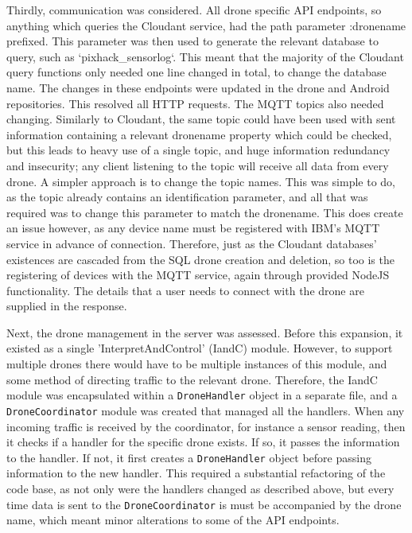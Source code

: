\documentclass{article}
\begin{document}
Thirdly, communication was considered. All drone specific API endpoints, so anything which queries the Cloudant service, had the path parameter :dronename prefixed. This parameter was then used to generate the relevant database to query, such as `pixhack\_sensorlog`. This meant that the majority of the Cloudant query functions only needed one line changed in total, to change the database name. The changes in these endpoints were updated in the drone and Android repositories. This resolved all HTTP requests. The MQTT topics also needed changing. Similarly to Cloudant, the same topic could have been used with sent information containing a relevant dronename property which could be checked, but this leads to heavy use of a single topic, and huge information redundancy and insecurity; any client listening to the topic will receive all data from every drone. A simpler approach is to change the topic names. This was simple to do, as the topic already contains an identification parameter, and all that was required was to change this parameter to match the dronename. This does create an issue however, as any device name must be registered with IBM's MQTT service in advance of connection. Therefore, just as the Cloudant databases' existences are cascaded from the SQL drone creation and deletion, so too is the registering of devices with the MQTT service, again through provided NodeJS functionality. The details that a user needs to connect with the drone are supplied in the response.

Next, the drone management in the server was assessed. Before this expansion, it existed as a single 'InterpretAndControl' (IandC) module. However, to support multiple drones there would have to be multiple instances of this module, and some method of directing traffic to the relevant drone. Therefore, the IandC module was encapsulated within a \texttt{DroneHandler} object in a separate file, and a \texttt{DroneCoordinator} module was created that managed all the handlers. When any incoming traffic is received by the coordinator, for instance a sensor reading, then it checks if a handler for the specific drone exists. If so, it passes the information to the handler. If not, it first creates a \texttt{DroneHandler} object before passing information to the new handler. This required a substantial refactoring of the code base, as not only were the handlers changed as described above, but every time data is sent to the \texttt{DroneCoordinator} is must be accompanied by the drone name, which meant minor alterations to some of the API endpoints.
\end{document}
